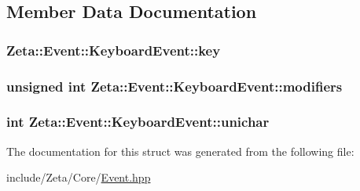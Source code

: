 \subsection{Member Data Documentation}
\hypertarget{structZeta_1_1Event_1_1KeyboardEvent_a0403d05eef48b6c3f9fd289437559494}{
\subsubsection[{key}]{ Zeta\+::\+Event\+::\+Keyboard\+Event\+::key}}\label{structZeta_1_1Event_1_1KeyboardEvent_a0403d05eef48b6c3f9fd289437559494}
\hypertarget{structZeta_1_1Event_1_1KeyboardEvent_a72c26e4419dc2819ac5a149a23e5bb93}{
\subsubsection[{modifiers}]{\setlength{\rightskip}{0pt plus 5cm}unsigned int Zeta\+::\+Event\+::\+Keyboard\+Event\+::modifiers}}\label{structZeta_1_1Event_1_1KeyboardEvent_a72c26e4419dc2819ac5a149a23e5bb93}
\hypertarget{structZeta_1_1Event_1_1KeyboardEvent_aa85199cbe831fb21614471006bf0cb8f}{
\subsubsection[{unichar}]{\setlength{\rightskip}{0pt plus 5cm}int Zeta\+::\+Event\+::\+Keyboard\+Event\+::unichar}}\label{structZeta_1_1Event_1_1KeyboardEvent_aa85199cbe831fb21614471006bf0cb8f}


The documentation for this struct was generated from the following file\+:\begin{DoxyCompactItemize}
\item 
include/\+Zeta/\+Core/\hyperlink{Event_8hpp}{Event.\+hpp}\end{DoxyCompactItemize}
